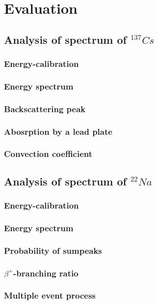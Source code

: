\documentclass[bigchapter,colorback,accentcolor=tud4b,linedtoc,11pt]{tudreport}
\begin{document}
\chapter{Evaluation}
\section{Analysis of spectrum of $^{137}Cs$}
\subsection{Energy-calibration}
\subsection{Energy spectrum}
\subsection{Backscattering peak}
\subsection{Abosrption by a lead plate}
\subsection{Convection coefficient}

\section{Analysis of spectrum of $^{22}Na$}
\subsection{Energy-calibration}
\subsection{Energy spectrum}
\subsection{Probability of sumpeaks}
\subsection{$\beta^+$-branching ratio}
\subsection{Multiple event process}
\end{document}

